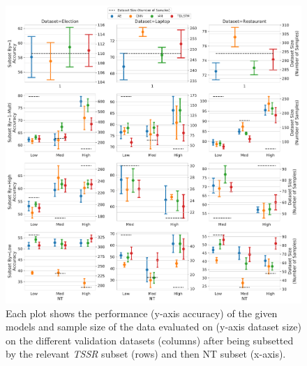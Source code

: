 \begin{figure}[h!]
    \centering
    \includegraphics[scale=0.4]{images/augmentation/methods_performance/baseline/baseline_tssr_nt_validation_scores.pdf}
    \caption{Each plot shows the performance (y-axis accuracy) of the given models and sample size of the data evaluated on (y-axis dataset size) on the different validation datasets (columns) after being subsetted by the relevant \textit{TSSR} subset (rows) and then NT subset (x-axis).}
    \label{fig:aug_baseline_tssr_nt_validation_scores}
\end{figure}